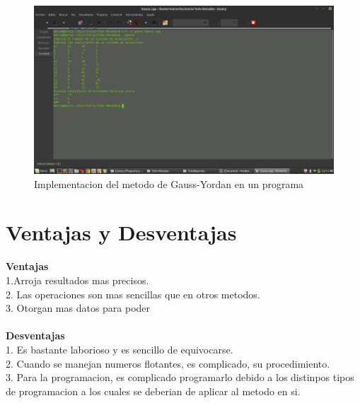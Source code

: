 \documentclass{article}
\begin{document}
\begin{multicols}{2}
\begin{figure}[H]
\centering
\includegraphics[scale=.125]{Gauss.png}
\caption{Implementacion del metodo de Gauss-Yordan en un programa}
\end{figure}

\section{Ventajas y Desventajas}
\label{sec:Ven}
\textbf{Ventajas}
\\
1.Arroja resultados mas precisos.
\\
2. Las operaciones son mas sencillas que en otros metodos.
\\
3. Otorgan mas datos para poder
\\
\\
\textbf{Desventajas}
\\
1. Es bastante laborioso y es sencillo de equivocarse.
\\
2. Cuando se manejan numeros flotantes, es complicado, su procedimiento.
\\
3. Para la programacion, es complicado programarlo debido a los distinpos tipos de programacion a los cuales se deberian de aplicar al metodo en si.
 
\end{multicols}
\end{document}
